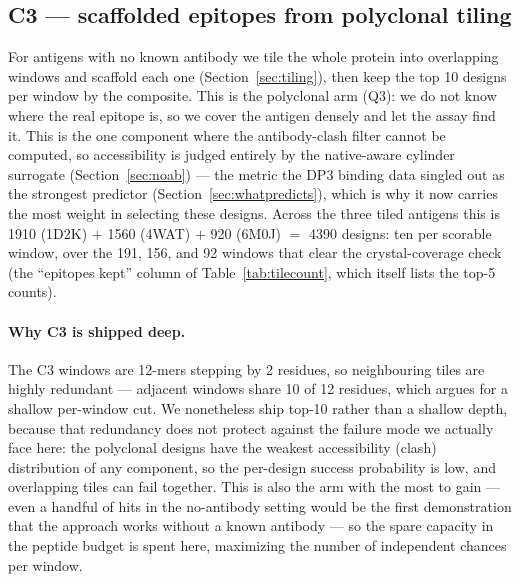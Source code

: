 \subsection{C3 --- scaffolded epitopes from polyclonal tiling}\label{sec:dp4c3}
For antigens with no known antibody we tile the whole protein into overlapping windows and
scaffold each one (Section~\ref{sec:tiling}), then keep the top \num{10} designs per window by the
composite. This is the polyclonal arm (Q3): we do not know where the real epitope is, so we cover
the antigen densely and let the assay find it. This is the one component where the antibody-clash
filter cannot be computed, so accessibility is judged entirely by the native-aware cylinder
surrogate (Section~\ref{sec:noab}) --- the metric the DP3 binding data singled out as the
strongest predictor (Section~\ref{sec:whatpredicts}), which is why it now carries the most weight
in selecting these designs. Across the three tiled antigens this is \num{1910} (1D2K) $+$ \num{1560}
(4WAT) $+$ \num{920} (6M0J) $=$ \num{4390} designs: ten per scorable window, over the \num{191}, \num{156},
and \num{92} windows that clear the crystal-coverage check (the ``epitopes kept'' column of
Table~\ref{tab:tilecount}, which itself lists the top-\num{5} counts).

\paragraph{Why C3 is shipped deep.} The C3 windows are \num{12}-mers stepping by \num{2} residues, so
neighbouring tiles are highly redundant --- adjacent windows share \num{10} of \num{12} residues, which
argues for a shallow per-window cut. We nonetheless ship top-\num{10} rather than a shallow depth,
because that redundancy does not protect against the failure mode we actually face here: the polyclonal
designs have the weakest accessibility (clash) distribution of any component, so the per-design success
probability is low, and overlapping tiles can fail together. This is also the arm with the most to gain
--- even a handful of hits in the no-antibody setting would be the first demonstration that the
approach works without a known antibody --- so the spare capacity in the peptide budget is spent here,
maximizing the number of independent chances per window.


